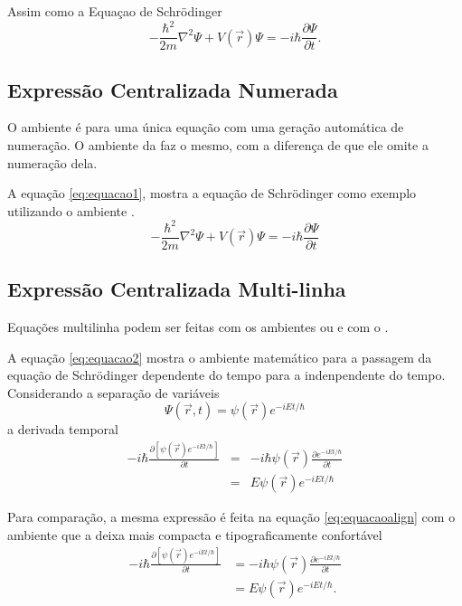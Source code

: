 Assim como a Equaçao de Schrödinger \[-\frac{\hbar^2}{2m}\nabla^2\Psi + V\left(\vec{r}\right)\Psi = -i\hbar \frac{\partial\Psi}{\partial t}.\]

\subsection{Expressão Centralizada Numerada}
    O ambiente  é para uma única equação com uma geração automática de numeração. O ambiente da  faz o mesmo, com a diferença de que ele omite a numeração dela.

    A equação \eqref{eq:equacao1}, mostra a equação de Schrödinger como exemplo utilizando o ambiente . 
        \begin{equation} \label{eq:equacao1}
            -\frac{\hbar^2}{2m}\nabla^2\Psi + V\left(\vec{r}\right)\Psi = -i\hbar \frac{\partial\Psi}{\partial t}
        \end{equation} 
        
\subsection{Expressão Centralizada Multi-linha}

        Equações multilinha podem ser feitas com os ambientes  ou  e com o . 
        
        A equação \eqref{eq:equacao2} mostra o ambiente matemático   para a passagem da equação de Schrödinger dependente do tempo para a indenpendente do tempo. Considerando a separação de variáveis 
        $$\Psi(\vec r,t)=\psi(\vec r)e^{-iEt/\hbar}$$
        a derivada temporal 
        \begin{eqnarray}\label{eq:equacao2}
         -i\hbar\frac{\partial\left[\psi\left(\vec{r}\right)e^{-iEt/\hbar}\right]}{\partial t}&=&-i\hbar\psi\left(\vec{r}\right)\frac{\partial e^{-iEt/\hbar}}{\partial t}\nonumber\\
         &=&E\psi\left(\vec{r}\right)e^{-iEt/\hbar}
        \end{eqnarray}
        
        Para comparação, a mesma expressão é feita na equação \eqref{eq:equacaoalign} com o ambiente  que a deixa mais compacta e tipograficamente confortável
        \begin{align}\label{eq:equacaoalign}
         -i\hbar\frac{\partial\left[\psi\left(\vec{r}\right)e^{-iEt/\hbar}\right]}{\partial t}&=-i\hbar\psi\left(\vec{r}\right)\frac{\partial e^{-iEt/\hbar}}{\partial t}\nonumber\\
         &=E\psi\left(\vec{r}\right)e^{-iEt/\hbar}.
        \end{align}

